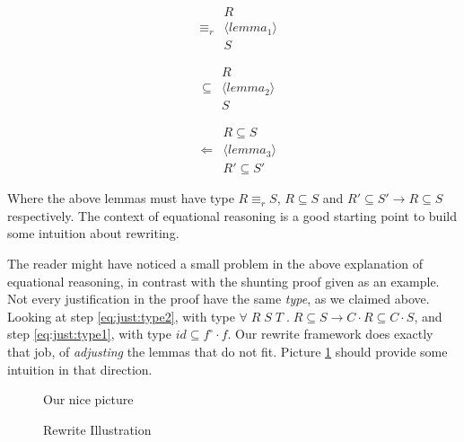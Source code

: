 \begin{center}
\begin{minipage}[t]{0.3\textwidth}
\begin{eqnarray*}
&& R \\
& \equiv_r & \langle lemma_1 \rangle \\
 && S
\end{eqnarray*}
\end{minipage}%
\begin{minipage}[t]{0.3\textwidth}
\begin{eqnarray*}
&& R \\
& \subseteq & \langle lemma_2 \rangle \\
 && S
\end{eqnarray*}
\end{minipage}%
%
\begin{minipage}[t]{0.3\textwidth}
\begin{eqnarray*}
&& R \subseteq S\\
& \Leftarrow & \langle lemma_3 \rangle \\
 && R' \subseteq S'
\end{eqnarray*}
\end{minipage}
\end{center}

Where the above lemmas must have type $R \equiv_r S$, $R \subseteq S$ and $R' \subseteq S' \rightarrow R \subseteq S$
respectively. The context of equational reasoning is a good starting point to build some intuition about rewriting.

The reader might have noticed a small problem in the above explanation of equational reasoning, 
in contrast with the shunting proof given as an example.
Not every justification in the proof have the same \emph{type}, as we claimed above. Looking at
step \ref{eq:just:type2}, with type $\forall\; R\; S\; T\;.\;R \subseteq S \rightarrow C \cdot R \subseteq C \cdot S$,
and step \ref{eq:just:type1}, with type $id \subseteq f^\circ \cdot f$. Our rewrite framework does exactly that job,
of \emph{adjusting} the lemmas that do not fit. Picture \ref{fig:rewriteillustration} should provide some intuition in that direction.

\begin{figure}[h]
\begin{TODO}
  \item Our nice picture
\end{TODO}
\caption{Rewrite Illustration}
\label{fig:rewriteillustration}
\end{figure}




